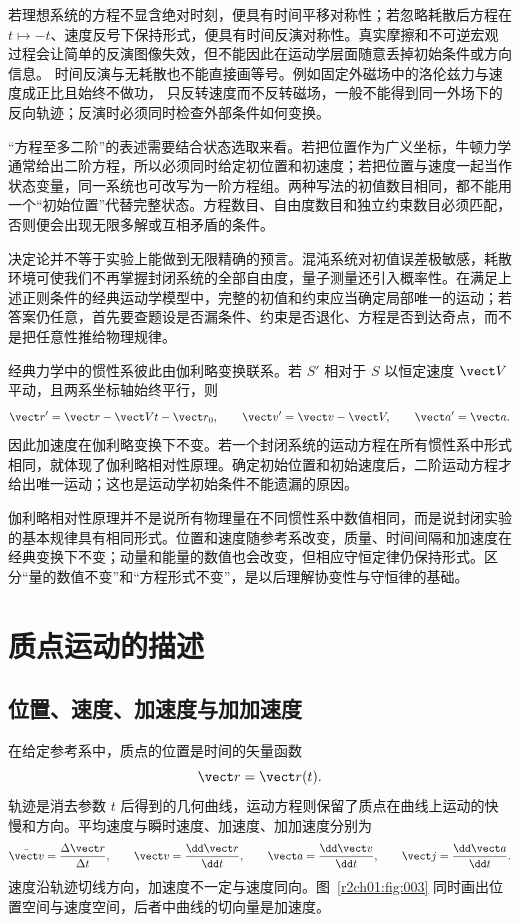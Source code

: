 若理想系统的方程不显含绝对时刻，便具有时间平移对称性；若忽略耗散后方程在 $t\mapsto-t$、速度反号下保持形式，便具有时间反演对称性。真实摩擦和不可逆宏观过程会让简单的反演图像失效，但不能因此在运动学层面随意丢掉初始条件或方向信息。
时间反演与无耗散也不能直接画等号。例如固定外磁场中的洛伦兹力与速度成正比且始终不做功，
只反转速度而不反转磁场，一般不能得到同一外场下的反向轨迹；反演时必须同时检查外部条件如何变换。

“方程至多二阶”的表述需要结合状态选取来看。若把位置作为广义坐标，牛顿力学通常给出二阶方程，所以必须同时给定初位置和初速度；若把位置与速度一起当作状态变量，同一系统也可改写为一阶方程组。两种写法的初值数目相同，都不能用一个“初始位置”代替完整状态。方程数目、自由度数目和独立约束数目必须匹配，否则便会出现无限多解或互相矛盾的条件。

决定论并不等于实验上能做到无限精确的预言。混沌系统对初值误差极敏感，耗散环境可使我们不再掌握封闭系统的全部自由度，量子测量还引入概率性。在满足上述正则条件的经典运动学模型中，完整的初值和约束应当确定局部唯一的运动；若答案仍任意，首先要查题设是否漏条件、约束是否退化、方程是否到达奇点，而不是把任意性推给物理规律。

经典力学中的惯性系彼此由伽利略变换联系。若 $S'$ 相对于 $S$ 以恒定速度 $\vect V$ 平动，且两系坐标轴始终平行，则
\begin{equation}
  \vect r'=\vect r-\vect Vt-\vect r_0,\qquad
  \vect v'=\vect v-\vect V,\qquad
  \vect a'=\vect a.
  \label{r2ch01:eq:006}
\end{equation}
因此加速度在伽利略变换下不变。若一个封闭系统的运动方程在所有惯性系中形式相同，就体现了伽利略相对性原理。确定初始位置和初始速度后，二阶运动方程才给出唯一运动；这也是运动学初始条件不能遗漏的原因。

伽利略相对性原理并不是说所有物理量在不同惯性系中数值相同，而是说封闭实验的基本规律具有相同形式。位置和速度随参考系改变，质量、时间间隔和加速度在经典变换下不变；动量和能量的数值也会改变，但相应守恒定律仍保持形式。区分“量的数值不变”和“方程形式不变”，是以后理解协变性与守恒律的基础。

\section{质点运动的描述}
\label{r2ch01:sec:kinematics}

\subsection{位置、速度、加速度与加加速度}

在给定参考系中，质点的位置是时间的矢量函数
\begin{equation}
  \vect r=\vect r(t).
  \label{r2ch01:eq:007}
\end{equation}
轨迹是消去参数 $t$ 后得到的几何曲线，运动方程则保留了质点在曲线上运动的快慢和方向。平均速度与瞬时速度、加速度、加加速度分别为
\begin{equation}
  \bar{\vect v}=\frac{\Delta\vect r}{\Delta t},\qquad
  \vect v=\frac{\dd\vect r}{\dd t},\qquad
  \vect a=\frac{\dd\vect v}{\dd t},\qquad
  \vect j=\frac{\dd\vect a}{\dd t}.
  \label{r2ch01:eq:008}
\end{equation}
速度沿轨迹切线方向，加速度不一定与速度同向。图~\ref{r2ch01:fig:003} 同时画出位置空间与速度空间，后者中曲线的切向量是加速度。

